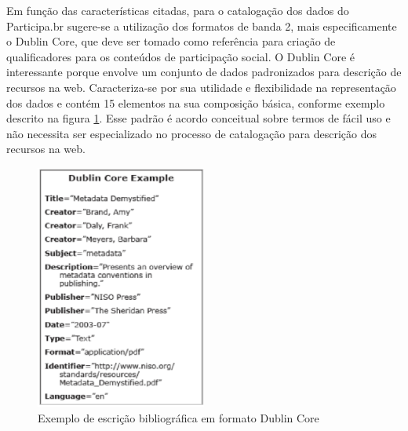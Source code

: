 Em função das características citadas, para o catalogação dos dados do Participa.br sugere-se a utilização dos formatos de banda 2, mais especificamente o Dublin Core, que deve ser tomado como referência para criação de qualificadores para os conteúdos de participação social. O Dublin Core é interessante porque envolve um conjunto de dados padronizados para descrição de recursos na web. Caracteriza-se por sua utilidade e flexibilidade na representação dos dados e contém 15 elementos na sua composição básica, conforme exemplo descrito na figura \ref{fig:exdublincore}. Esse padrão é acordo conceitual sobre termos de fácil uso e não necessita ser especializado no processo de catalogação para descrição dos recursos na web.

\graphicspath{{figuras/}}
\begin{figure}[H]
\centering
\includegraphics[width=0.5\textwidth]{exemplo_dublincore}
\caption{Exemplo de escrição bibliográfica em formato Dublin Core}
\label{fig:exdublincore}
\end{figure}



